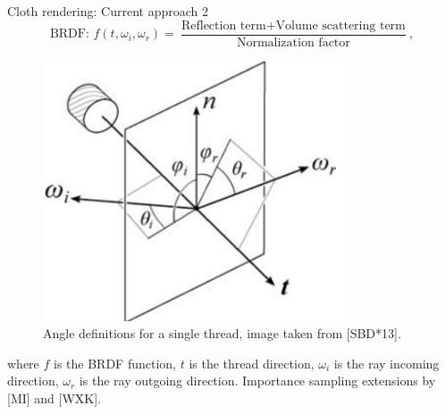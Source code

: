 \documentclass{beamer}
\begin{document}
\begin{frame}{Cloth rendering: Current approach 2}
\begin{equation*} 
\mbox{BRDF: } f(t, \omega_i, \omega_r) =  \frac{\mbox{Reflection term} + \mbox{Volume scattering term}}{\mbox{Normalization factor}},
\end{equation*}

\begin{multicols}{2}

\begin{figure}[!htb]
    \centering
    \begin{minipage}{.5\textwidth}
        \centering
        \includegraphics[width=0.8\textwidth]{img/cloth_directions}
        \caption*{\tiny{Angle definitions for a single thread, image taken from [SBD*13].}}
    \end{minipage}%
\end{figure}

%
%
\vfill
\columnbreak
\vspace*{0.2cm}
\small{ where $f$ is the BRDF function, $t$ is the thread direction, $\omega_i$ is the ray incoming direction, $\omega_r$ is the ray outgoing direction. }
\vspace*{1cm}
\newline
Importance sampling extensions by [MI] and [WXK].
\end{multicols}

\end{frame}
\end{document}

